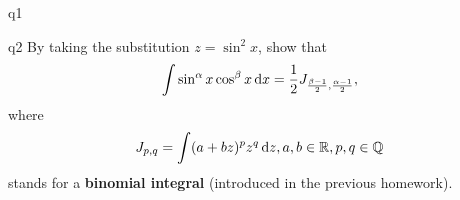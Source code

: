 \documentclass[reqno]{alittlebear}
\begin{document}
\begin{exercise}{}{}
\begin{question}{}{q1}
    \end{question}
    \begin{question}{}{q2}
        By taking the substitution $z=\sin^2x$, show that \[\int \sin ^\alpha x\cos^\beta x\mathop{}\!\mathrm{d} x=\frac12 J_{\frac{\beta-1}{2},\frac{\alpha-1}{2}},\] where \[J_{p,q}=\int(a+bz)^p z^q\mathop{}\!\mathrm{d} z, a,b\in\mathbb{R}, p,q\in\mathbb{Q}\] stands for a \textbf{binomial integral} (introduced in the previous homework).
        \qbreak
        \begin{mathnote}
            \begin{center}
            \end{center}


\end{mathnote}
\end{question}
\end{exercise}
\end{document}
